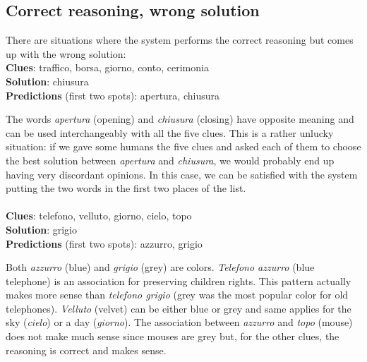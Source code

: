 \documentclass[twoside,twocolumn]{article}
\newenvironment{myfont}{\small\fontfamily{pag}\selectfont}{\par}
\begin{document}
	\subsection{Correct reasoning, wrong solution}
	There are situations where the system performs the correct reasoning but comes up with the wrong solution: \\
	\begin{myfont}
	\textbf{Clues}: traffico, borsa, giorno, conto, cerimonia \\
	\textbf{Solution}: chiusura \\
	\textbf{Predictions} (first two spots): apertura, chiusura \\
	\end{myfont}
	The words \textit{apertura} (opening) and \textit{chiusura} (closing) have opposite meaning and can be used interchangeably with all the five clues. This is a rather unlucky situation: if we gave some humans the five clues and asked each of them to choose the best solution between \textit{apertura} and \textit{chiusura}, we would probably end up having very discordant opinions. In this case, we can be satisfied with the system putting the two words in the first two places of the list. \\ \\
	\begin{myfont}
	\textbf{Clues}: telefono, velluto, giorno, cielo, topo \\
	\textbf{Solution}: grigio \\
	\textbf{Predictions} (first two spots): azzurro, grigio \\
	\end{myfont}
	Both \textit{azzurro} (blue) and \textit{grigio} (grey) are colors. \textit{Telefono azzurro} (blue telephone) is an association for preserving children rights. This pattern actually makes more sense than \textit{telefono grigio} (grey was the most popular color for old telephones). \textit{Velluto} (velvet) can be either blue or grey and same applies for the sky (\textit{cielo}) or a day (\textit{giorno}). The association between \textit{azzurro} and \textit{topo} (mouse) does not make much sense since mouses are grey but, for the other clues, the reasoning is correct and makes sense.
	 
\end{document}
